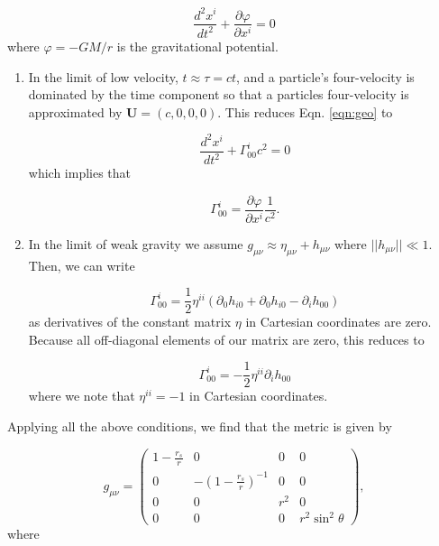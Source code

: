 \documentclass{CUP-JNL-DTM}%
\theoremstyle{definition}
\numberwithin{equation}{section}
\begin{document}
\begin{equation}
    \frac{d^2x^i}{dt^2} + \frac{\partial\varphi}{\partial x^i} = 0
    \label{eqn:newton}
\end{equation}
where $\varphi = -GM/r$ is the gravitational potential. 

\begin{enumerate}
\item In the limit of low velocity, $t \approx \tau = ct$, and a particle's four-velocity is dominated by the time component so that a particles four-velocity is approximated by $\textbf{U} = (c,0,0,0)$. This reduces Eqn. \ref{eqn:geo} to 

\begin{equation}
     \frac{d^2x^i}{dt^2} + \Gamma^i_{00}c^2 = 0
     \label{eqn:geo_low_v}
\end{equation}
which implies that 

\begin{equation}
    \Gamma^i_{00} = \frac{\partial \varphi}{\partial x^i}\frac{1}{c^2}. 
\end{equation}

\item In the limit of weak gravity we assume $g_{\mu\nu} \approx \eta_{\mu\nu} + h_{\mu\nu}$ where $||h_{\mu\nu}|| \ll 1$. Then, we can write 

\begin{equation}
    \Gamma^i_{00} = \frac{1}{2}\eta^{ii}(\partial_0 h_{i0} + \partial_0h_{i0} - \partial_i h_{00})
\end{equation}
as derivatives of the constant matrix $\eta$ in Cartesian coordinates are zero. Because all off-diagonal elements of our matrix are zero, this reduces to 

\begin{equation}
    \Gamma^i_{00} = -\frac{1}{2}\eta^{ii}\partial_i h_{00}
\end{equation}
where we note that $\eta^{ii} = -1$ in Cartesian coordinates. 
\end{enumerate}

\noindent Applying all the above conditions, we find that the metric is given by

\begin{equation}
    g_{\mu\nu} = \begin{pmatrix}
        1 - \frac{r_s}{r} & 0 & 0 & 0 \\
        0 & -(1 - \frac{r_s}{r})^{-1} & 0 & 0 \\
        0 & 0 & r^2 & 0 \\
        0 & 0 & 0 & r^2\sin^2\theta
    \end{pmatrix},
\end{equation}
where 
\end{document}
